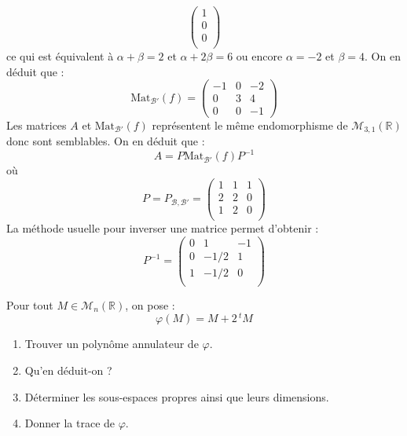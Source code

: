 \documentclass[a4paper,10pt]{report}
\begin{document}
\begin{enumerate}
$$\begin{pmatrix}
1 \\
0 \\
0 \\
\end{pmatrix}$$
ce qui est équivalent à $\alpha+ \beta =2$ et $\alpha+2 \beta =6$ ou encore $\alpha=-2$ et $\beta =4$. On en déduit que :
$$ \textrm{Mat}_{\mathcal{B}'}(f) = \begin{pmatrix}
-1 & 0 & -2 \\
0 & 3 & 4 \\
0 & 0 & -1
\end{pmatrix}$$
Les matrices $A$ et $\textrm{Mat}_{\mathcal{B}'}(f)$ représentent le même endomorphisme de $\mathcal{M}_{3,1}(\mathbb{R})$ donc sont semblables. On en déduit que :
$$ A = P \textrm{Mat}_{\mathcal{B}'}(f) P^{-1}$$
où 
$$P=P_{\mathcal{B}, \mathcal{B}'} = \begin{pmatrix}
1 & 1 & 1 \\
2 & 2 & 0 \\
1 & 2 & 0 \\
\end{pmatrix}$$
La méthode usuelle pour inverser une matrice permet d'obtenir :
$$ P^{-1} = \begin{pmatrix}
0 & 1 & -1 \\
0 & -1/2 & 1 \\
1 & -1/2 & 0 \\
\end{pmatrix}$$

\end{enumerate}

\begin{Exercice}{}  Pour tout $M \in \mathcal{M}_n(\mathbb{R})$, on pose :
$$ \varphi(M) = M +2 \, {}^t M$$
\begin{enumerate}
\item Trouver un polynôme annulateur de $\varphi$.
\item Qu'en déduit-on ?
\item Déterminer les sous-espaces propres ainsi que leurs dimensions.
\item Donner la trace de $\varphi$.
\end{enumerate}
\end{Exercice}

\corr 
\end{document}

